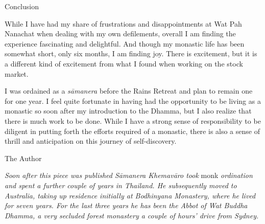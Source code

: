 Conclusion

While I have had my share of frustrations and disappointments at Wat Pah
Nanachat when dealing with my own defilements, overall I am finding the
experience fascinating and delightful. And though my monastic life has
been somewhat short, only six months, I am finding joy. There is
excitement, but it is a different kind of excitement from what I found
when working on the stock market. 

I was ordained as a \emph{sāmanera} before the Rains Retreat and plan to
remain one for one year. I feel quite fortunate in having had the
opportunity to be living as a monastic so soon after my introduction to
the Dhamma, but I also realize that there is much work to be done. While
I have a strong sense of responsibility to be diligent in putting forth
the efforts required of a monastic, there is also a sense of thrill and
anticipation on this journey of self-discovery. 

The Author

\emph{Soon after this piece was published Sāmanera Khemavāro took} monk
\emph{ordination and spent a further couple of years in Thailand. He
subsequently moved to Australia, taking up residence initially at
Bodhinyana Monastery, where he lived for seven years. For the last three
years he has been the Abbot of Wat Buddha Dhamma, a very secluded forest
monastery a couple of hours' drive from Sydney.}

